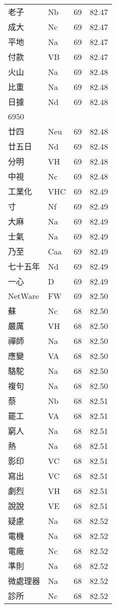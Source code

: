 \documentclass[twocolumn]{book}
\begin{document}
\begin{supertabular}{llrr}
老子 & Nb & 69 &  82.47\\
成大 & Nc & 69 &  82.47\\
平地 & Na & 69 &  82.47\\
付款 & VB & 69 &  82.47\\
火山 & Na & 69 &  82.48\\
比重 & Na & 69 &  82.48\\
日據 & Nd & 69 &  82.48\\
6950\\
廿四 & Neu & 69 &  82.48\\
廿五日 & Nd & 69 &  82.48\\
分明 & VH & 69 &  82.48\\
中視 & Nc & 69 &  82.48\\
工業化 & VHC & 69 &  82.49\\
寸 & Nf & 69 &  82.49\\
大麻 & Na & 69 &  82.49\\
士氣 & Na & 69 &  82.49\\
乃至 & Caa & 69 &  82.49\\
七十五年 & Nd & 69 &  82.49\\
一心 & D & 69 &  82.49\\
NetWare & FW & 69 &  82.50\\
蘇 & Nc & 68 &  82.50\\
嚴厲 & VH & 68 &  82.50\\
禪師 & Na & 68 &  82.50\\
應變 & VA & 68 &  82.50\\
駱駝 & Na & 68 &  82.50\\
複句 & Na & 68 &  82.50\\
蔡 & Nb & 68 &  82.51\\
罷工 & VA & 68 &  82.51\\
窮人 & Na & 68 &  82.51\\
熱 & Na & 68 &  82.51\\
影印 & VC & 68 &  82.51\\
寫出 & VC & 68 &  82.51\\
劇烈 & VH & 68 &  82.51\\
說說 & VE & 68 &  82.51\\
疑慮 & Na & 68 &  82.52\\
電機 & Na & 68 &  82.52\\
電廠 & Nc & 68 &  82.52\\
準則 & Na & 68 &  82.52\\
微處理器 & Na & 68 &  82.52\\
診所 & Nc & 68 &  82.52\\

\end{supertabular}
\end{document}
